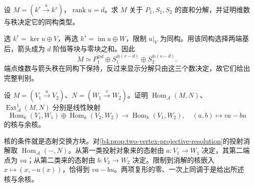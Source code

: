 \begin{exercise}\label{b4:ex:19-arrow-rank-decomposition}
	设 \(M=(k^r\xrightarrow{u}k^s)\)，\(\operatorname{rank}u=d\)。求 \(M\) 关于 \(P_1,S_1,S_2\) 的直和分解，并证明维数与秩决定它的同构类型。
\end{exercise}
\begin{solution}
	选 \(k^r=\ker u\oplus V\)，再选 \(k^s=\operatorname{im}u\oplus W\)，限制 \(u|_V\) 为同构。用该同构选择两端基后，箭头成为 \(d\) 阶恒等块与零块之和。因此
	\[
		M\simeq P_1^{\oplus d}\oplus S_1^{\oplus(r-d)}\oplus S_2^{\oplus(s-d)}.
	\]
	端点维数与箭头秩在同构下保持，反过来显示分解只由这三个数决定，故它们给出完整判别。
\end{solution}

\begin{exercise}\label{b4:ex:19-arrow-ext-formula}
	设 \(M=(V_1\xrightarrow{u}V_2)\)、\(N=(W_1\xrightarrow{v}W_2)\)。证明 \(\operatorname{Hom}_{\mathcal A}(M,N)\)、\(\operatorname{Ext}_{\mathcal A}^1(M,N)\) 分别是线性映射
	\[
		\operatorname{Hom}_k(V_1,W_1)\oplus\operatorname{Hom}_k(V_2,W_2) \longrightarrow\operatorname{Hom}_k(V_1,W_2),\quad (a,b)\longmapsto va-bu
	\]
	的核与余核。
\end{exercise}
\begin{solution}
	核的条件就是态射交换方块。对\cref{b4:prop:two-vertex-projective-resolution}的投射消解取 \(\operatorname{Hom}_{\mathcal A}(-,N)\)。从第一类投射对象来的态射由 \(a:V_1\to W_1\) 决定，其第二端点为 \(va\)；从第二类来的态射由 \(b:V_2\to W_2\) 决定。限制到消解的核嵌入 \(x\mapsto(x,-u(x))\)，恰得到 \(va-bu\)。两项复形的零、一次上同调于是给出所述核与余核。
\end{solution}

